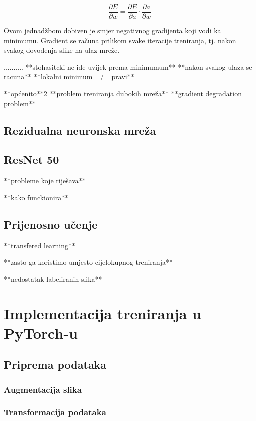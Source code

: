 \documentclass[times, utf8, zavrsni,numeric,pstricks]{fer}
\begin{document}
\begin{equation}\label{eq:graident_der}
	\frac{\partial E}{\partial w} = \frac{\partial E}{\partial a} \cdot \frac{\partial a}{\partial w}
\end{equation}

Ovom jednadžbom dobiven je smjer negativnog gradijenta koji vodi ka minimumu. Gradient se računa prilikom svake iteracije treniranja, tj. nakon svakog dovođenja slike na ulaz mreže. 


..........
**stohasitcki ne ide uvijek prema minimumum**
**nakon svakog ulaza se racuna**
**lokalni minimum =/= pravi**



**općenito**2
**problem treniranja dubokih mreža**	
**gradient degradation problem**


\subsection{Rezidualna neuronska mreža}

\subsection{ResNet 50}
**probleme koje riješava**

**kako funckionira**

\subsection{Prijenosno učenje}
**transfered learning**

**zasto ga koristimo umjesto cijelokupnog treniranja**

**nedostatak labeliranih slika**

\section{Implementacija treniranja u PyTorch-u}
\subsection{Priprema podataka}
\subsubsection{Augmentacija slika}
\subsubsection{Transformacija podataka}
\end{document}
